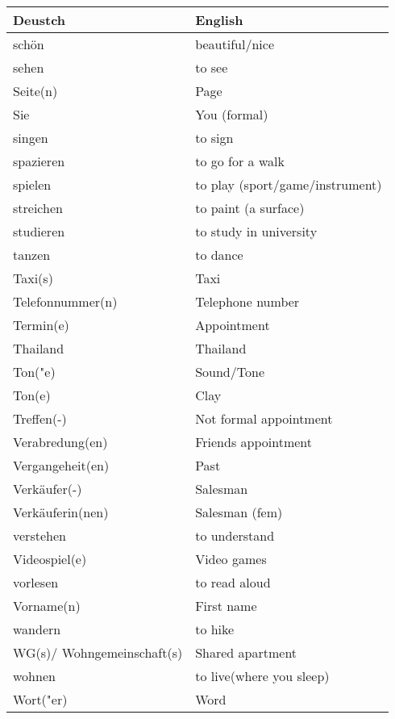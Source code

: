 \documentclass{article}
\renewcommand{\arraystretch}{1}
\begin{document}
\hfill
\begin{minipage}{0.48\textwidth}
    \centering
    \renewcommand{\arraystretch}{1.5}
    \begin{tabular}{|>{\raggedright\arraybackslash}p{3.5cm}|>{\raggedright\arraybackslash}p{3.5cm}|}
        \hline
        \rowcolor{gray!20} \textbf{Deustch} & \textbf{English} \\
        \hline
        schön & beautiful/nice \\\hline
        sehen & to see \\\hline
        Seite(n) & Page \\\hline
        Sie & You (formal) \\\hline
        singen & to sign \\\hline
        spazieren & to go for a walk \\\hline
        spielen & to play (sport/game/instrument) \\\hline
        streichen & to paint (a surface) \\\hline
        studieren & to study in university \\\hline
        tanzen & to dance \\\hline
        Taxi(s) & Taxi \\\hline
        Telefonnummer(n) & Telephone number \\\hline
        Termin(e) & Appointment \\\hline
        Thailand & Thailand \\\hline
        Ton("e) & Sound/Tone \\\hline
        Ton(e) & Clay \\\hline
        Treffen(-) & Not formal appointment \\\hline
        Verabredung(en) & Friends appointment \\\hline
        Vergangeheit(en) & Past \\\hline
        Verkäufer(-) & Salesman \\\hline
        Verkäuferin(nen) & Salesman (fem) \\\hline
        verstehen & to understand \\\hline
        Videospiel(e) & Video games \\\hline
        vorlesen & to read aloud \\\hline
        Vorname(n) & First name \\\hline
        wandern & to hike \\\hline
        WG(s)/ Wohngemeinschaft(s) & Shared apartment \\\hline
        wohnen & to live(where you sleep) \\\hline
        Wort("er) & Word \\\hline
    \end{tabular}
\end{minipage}
\end{document}
